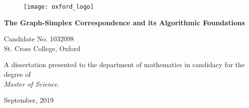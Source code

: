 \begin{titlepage}
	\vspace*{2cm}
	\begin{figure}
		\centering 
		\texttt{[image: oxford\_logo]}
	\end{figure}
	
	\begin{center}
		\begin{adjustwidth}{7em}{7em}
			\centering 
					{\bf \large The Graph-Simplex Correspondence and its Algorithmic Foundations}\\
			\end{adjustwidth}
		\vspace{4cm}
		Candidate No. 1032098\\
		St. Cross College, Oxford
		\vspace{1.5cm}
		\begin{adjustwidth}{9em}{9em}
			\centering 
					A dissertation presented to  the department of mathematics in candidacy for the degree of \\
					\emph{Master of Science}.
			\end{adjustwidth}
		\vspace{1.5cm}
		September, 2019
	\end{center}
\end{titlepage}